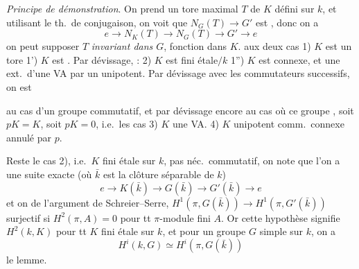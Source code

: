 \documentclass[11pt,a4paper]{article}
\begin{document}
\emph{Principe de démonstration}. On prend un tore maximal
$T$ de $K$ défini sur $k$, et utilisant le th.\ de conjugaison, on voit que
$N_G(T) \to G'$ est  , donc on a
\[
e \to N_K(T) \to N_G(T) \to G' \to e
\]
 on peut supposer $T$ \emph{invariant dans $G$}, \ill{} fonction dans
$K$.  aux deux cas 1) $K$ est un tore 1') $K$ est
  . Par dévissage,
 : 2) $K$ est fini étale$/k$
1'') $K$ est connexe, et  une ext.\ d'une VA par un
unipotent.
 Par dévissage avec les commutateurs
successifs, on est 




au cas d'un groupe commutatif, et par dévissage encore au cas où ce groupe
\struck{\ill{}}, soit $pK = K$, soit $pK = 0$, i.e.\ les cas 3) $K$ une VA.
4) $K$ unipotent comm.\ connexe annulé par $p$.

Reste le cas 2), i.e.\ $K$ fini étale sur $k$, pas néc.\ commutatif, on note
que l'on a une suite exacte (où $\bar k$ est la clôture 
séparable de $k$)
\[
e \to K(\bar k) \to G(\bar k) \to G'(\bar k) \to e
\]
et on  de l'argument de Schreier--Serre, 
$H^1(\pi, G(\bar k)) \to H^1(\pi, G'(\bar k))$ surjectif si $H^2(\pi,A)=0$ pour
 tt $\pi$-module fini $A$. Or cette hypothèse signifie $H^2(k,K)$
 pour tt $K$ fini étale sur $k$, et pour un groupe $G$
simple sur $k$, on a
\[
H^i(k,G) \simeq H^i(\pi, G(\bar k))
\]
 le lemme.
\end{document}
